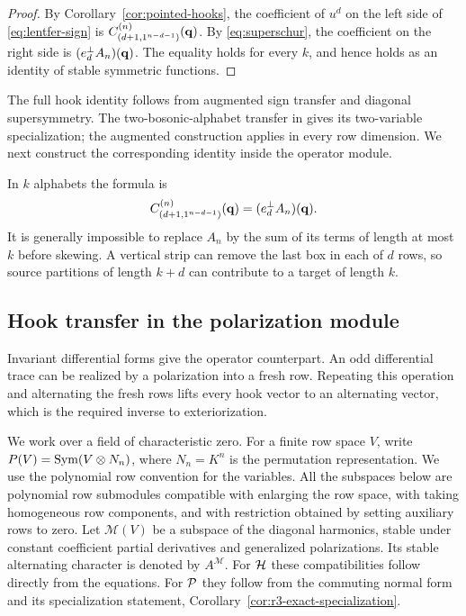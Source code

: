 \begin{proof}
By Corollary~\ref{cor:pointed-hooks}, the coefficient
of $u^d$ on the left side of \eqref{eq:lentfer-sign}
is $C_{(d+1,1^{n-d-1})}^{(n)}(\mathbf q)$.
By \eqref{eq:superschur}, the coefficient on the
right side is $(e_d^\perp A_n)(\mathbf q)$.
The equality holds for every $k$, and hence holds
as an identity of stable symmetric functions.
\end{proof}

The full hook identity follows from augmented sign transfer and
diagonal supersymmetry.  The two-bosonic-alphabet transfer in
\cite{GLM} gives its two-variable specialization; the augmented
construction applies in every row dimension.  We next construct the
corresponding identity inside the operator module.

\begin{remark}
\label{rem:skew-specialization}
In \(k\) alphabets the formula is
\[
 C_{(d+1,1^{n-d-1})}^{(n)}(\mathbf q)=(e_d^\perp A_n)(\mathbf q).
\]
It is generally impossible to replace $A_n$ by the
sum of its terms of length at most $k$ before skewing.
A vertical strip can remove the last box in each of
$d$ rows, so source partitions of length $k+d$ can
contribute to a target of length $k$.
\end{remark}

\subsection{Hook transfer in the polarization module}
\label{sec:r2-operator-hooks}

Invariant differential forms give the operator counterpart.  An
odd differential trace can be realized by a polarization into a
fresh row.  Repeating this operation and alternating the fresh
rows lifts every hook vector to an alternating vector, which is
the required inverse to exteriorization.

We work over a field of characteristic zero.  For a finite row space
$V$, write $P(V)=\operatorname{Sym}(V\otimes N_n)$, where $N_n=K^n$ is the permutation
representation.  We use the polynomial row convention for the
variables.  All the subspaces below are polynomial row submodules
compatible with enlarging the row space, with taking homogeneous row
components, and with restriction obtained by setting auxiliary rows
to zero.  Let $\mathcal M(V)$
be a subspace of the diagonal harmonics, stable under constant
coefficient partial derivatives and generalized polarizations.
Its stable alternating character is denoted by $A^{\mathcal M}$.
For $\mathcal H$ these compatibilities follow directly from the
equations.  For $\mathcal P$ they follow from the commuting normal form
and its specialization statement,
Corollary~\ref{cor:r3-exact-specialization}.  

